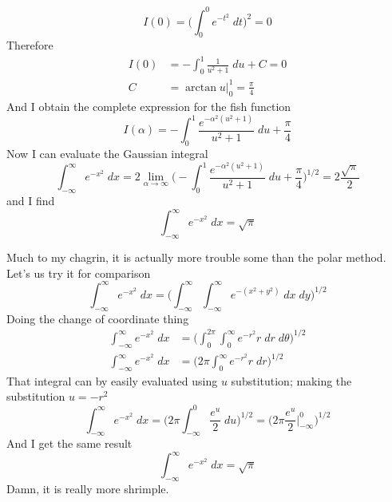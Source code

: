 \documentclass[../main.tex]{subfiles}
\begin{document}
\begin{equation*}
    I(0)=\biggl(\int_{0}^{0}e^{-t^2}\;dt\biggr)^2=0
\end{equation*}
Therefore
\begin{align*}
    I(0)&=-\int_{0}^{1}\frac{1}{u^2+1}\;du+C=0\\
    C&=\arctan u\bigg|_{0}^{1}=\frac{\pi}{4}
\end{align*}
And I obtain the complete expression for the fish function
\begin{equation*}
    I(\alpha)=-\int_{0}^{1}\frac{e^{-\alpha^2(u^2+1)}}{u^2+1}\;du+\frac{\pi}{4}
\end{equation*}
Now I can evaluate the Gaussian integral
\begin{equation*}
    \int_{-\infty}^{\infty}e^{-x^2}\;dx=2\lim_{\alpha\rightarrow\infty}\biggl(-\int_{0}^{1}\frac{e^{-\alpha^2(u^2+1)}}{u^2+1}\;du+\frac{\pi}{4}\biggr)^{1/2}=2\frac{\sqrt{\pi}}{2}
\end{equation*}
and I find 
\begin{equation*}
    \int_{-\infty}^{\infty}e^{-x^2}\;dx=\sqrt{\pi}
\end{equation*}

Much to my chagrin, it is actually more trouble some than the polar method. Let's us try it for comparison
\begin{equation*}
    \int_{-\infty}^{\infty}e^{-x^2}\;dx=\biggl(\int_{-\infty}^{\infty}\int_{-\infty}^{\infty}e^{-(x^2+y^2)}\;dx\;dy\biggr)^{1/2}
\end{equation*}
Doing the change of coordinate thing
\begin{align*}
    \int_{-\infty}^{\infty}e^{-x^2}\;dx&=\biggl(\int_{0}^{2\pi}\int_{0}^{\infty}e^{-r^2}r\;dr\;d\theta \biggr)^{1/2}\\
    \int_{-\infty}^{\infty}e^{-x^2}\;dx& = \biggl(2\pi\int_{0}^{\infty}e^{-r^2}r\;dr \biggr)^{1/2}
\end{align*}
That integral can by easily evaluated using $u$ substitution; making the substitution $u=-r^2$
\begin{equation*}
    \int_{-\infty}^{\infty}e^{-x^2}\;dx = \biggl(2\pi\int_{-\infty}^{0}\frac{e^u}{2}\;du \biggr)^{1/2} =  \biggl(2\pi\frac{e^u}{2}\bigg|_{-\infty}^{0} \biggr)^{1/2}
\end{equation*}
And I get the same result 
\begin{equation*}
    \int_{-\infty}^{\infty}e^{-x^2}\;dx = \sqrt{\pi}
\end{equation*}
Damn, it is really more shrimple.
\end{document}
